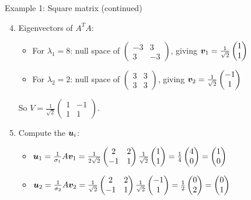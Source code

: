 \documentclass[aspectratio=169]{beamer}\usepackage[]{graphicx}\usepackage[]{xcolor}
\begin{document}
\begin{frame}{Example 1: Square matrix (continued)}
\begin{enumerate}
\setcounter{enumi}{3}
\item Eigenvectors of $A^TA$:
\begin{itemize}
\item For $\lambda_1=8$: null space of $\begin{pmatrix} -3 & 3 \\ 3 & -3 \end{pmatrix}$, giving $\bm{v}_1 = \frac{1}{\sqrt{2}}\begin{pmatrix} 1 \\ 1 \end{pmatrix}$
\item For $\lambda_2=2$: null space of $\begin{pmatrix} 3 & 3 \\ 3 & 3 \end{pmatrix}$, giving $\bm{v}_2 = \frac{1}{\sqrt{2}}\begin{pmatrix} -1 \\ 1 \end{pmatrix}$
\end{itemize}
So $V = \frac{1}{\sqrt{2}}\begin{pmatrix} 1 & -1 \\ 1 & 1 \end{pmatrix}$.
\item Compute the $\bm{u}_i$:
\begin{itemize}
\item $\bm{u}_1 = \frac{1}{\sigma_1}A\bm{v}_1 = \frac{1}{2\sqrt{2}}\begin{pmatrix} 2 & 2 \\ -1 & 1 \end{pmatrix}\frac{1}{\sqrt{2}}\begin{pmatrix} 1 \\ 1 \end{pmatrix} = \frac{1}{4}\begin{pmatrix} 4 \\ 0 \end{pmatrix} = \begin{pmatrix} 1 \\ 0 \end{pmatrix}$
\item $\bm{u}_2 = \frac{1}{\sigma_2}A\bm{v}_2 = \frac{1}{\sqrt{2}}\begin{pmatrix} 2 & 2 \\ -1 & 1 \end{pmatrix}\frac{1}{\sqrt{2}}\begin{pmatrix} -1 \\ 1 \end{pmatrix} = \frac{1}{2}\begin{pmatrix} 0 \\ 2 \end{pmatrix} = \begin{pmatrix} 0 \\ 1 \end{pmatrix}$

\end{itemize}
\end{enumerate}
\end{frame}
\end{document}
